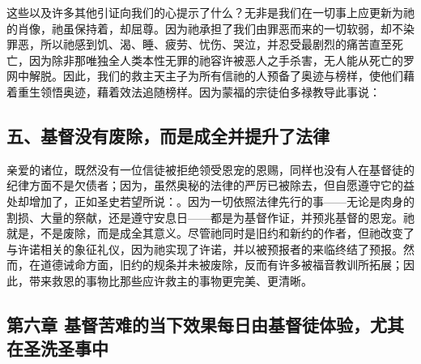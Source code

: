 这些以及许多其他引证向我们的心提示了什么？无非是我们在一切事上应更新为祂的肖像，祂虽保持着，却屈尊。因为祂承担了我们由罪恶而来的一切软弱，却不染罪恶，所以祂感到饥、渴、睡、疲劳、忧伤、哭泣，并忍受最剧烈的痛苦直至死亡，因为除非那唯独全人类本性无罪的祂容许被恶人之手杀害，无人能从死亡的罗网中解脱。因此，我们的救主天主子为所有信祂的人预备了奥迹与榜样，使他们藉着重生领悟奥迹，藉着效法追随榜样。因为蒙福的宗徒伯多禄教导此事说： \par


\subsection{五、基督没有废除，而是成全并提升了法律}

亲爱的诸位，既然没有一位信徒被拒绝领受恩宠的恩赐，同样也没有人在基督徒的纪律方面不是欠债者；因为，虽然奥秘的法律的严厉已被除去，但自愿遵守它的益处却增加了，正如圣史若望所说：。因为一切依照法律先行的事——无论是肉身的割损、大量的祭献，还是遵守安息日——都是为基督作证，并预兆基督的恩宠。祂就是，不是废除，而是成全其意义。尽管祂同时是旧约和新约的作者，但祂改变了与许诺相关的象征礼仪，因为祂实现了许诺，并以被预报者的来临终结了预报。然而，在道德诫命方面，旧约的规条并未被废除，反而有许多被福音教训所拓展；因此，带来救恩的事物比那些应许救主的事物更完美、更清晰。\par


\subsection{第六章 基督苦难的当下效果每日由基督徒体验，尤其在圣洗圣事中}

